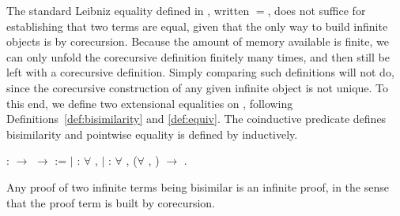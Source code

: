 The standard Leibniz equality defined in \Coq, written $=$, does not suffice
for establishing that two terms are equal, given that the only way to build
infinite objects is by corecursion. Because the amount of memory available is
finite, we can only unfold the corecursive definition finitely many times, and
then still be left with a corecursive definition. Simply comparing such
definitions will not do, since the corecursive construction of any given
infinite object is not unique. To this end, we define two extensional
equalities on , following
Definitions~\ref{def:bisimilarity} and \ref{def:equiv}. The coinductive
predicate  defines bisimilarity and
pointwise equality is defined by 
inductively.
\begin{singlespace}
\begin{coqdoccode}
\coqdocnoindent
{}
 :
 \ensuremath{\rightarrow}
 \ensuremath{\rightarrow}
 :=\coqdoceol
\coqdocindent{1.00em}
\ensuremath{|}
 :
\ensuremath{\forall} ,
 
 \coqdoceol
\coqdocindent{1.00em}
\ensuremath{|}
 :
\ensuremath{\forall}   ,
(\ensuremath{\forall} ,
 
 )
\ensuremath{\rightarrow}
 
 
.\coqdoceol
\end{coqdoccode}
\end{singlespace}
Any proof of two infinite terms being bisimilar is an infinite proof, in the
sense that the proof term is built by corecursion.
